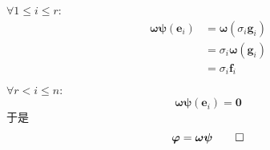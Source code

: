 \begin{brown}
\begin{Proof}
            $\forall1\leqslant i\leqslant r:$\begin{align*}
                \bm{\omega\psi}\left(
                    \bm{e}_i
                \right)&=\bm{\omega}\left(
                    \sigma_i\bm{g}_i
                \right)\\
                &=\sigma_i\bm{\omega}\left(
                    \bm{g}_i
                \right)\\
                &=\sigma_i\bm{f}_i\\
            \end{align*}
            $\forall r<i\leqslant n:$\[
            \bm{\omega\psi}\left(
                \bm{e}_i
                \right)=\bm{0}
            \]于是\[
            \bm{\varphi}=\bm{\omega\psi}\qedhere
            \]
    \end{Proof}
\end{brown}

